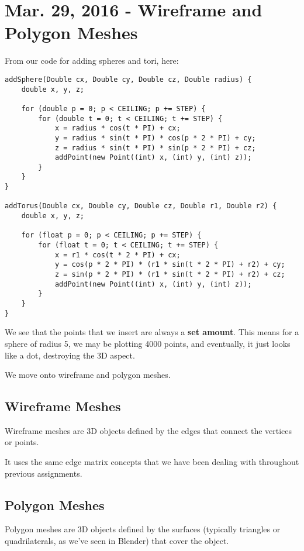 \documentclass[11pt,fleqn]{article}
\theoremstyle{definition}
\begin{document}
\section{Mar. 29, 2016 - Wireframe and Polygon Meshes}

From our code for adding spheres and tori, here:

\begin{verbatim}
addSphere(Double cx, Double cy, Double cz, Double radius) {
    double x, y, z;

    for (double p = 0; p < CEILING; p += STEP) {
        for (double t = 0; t < CEILING; t += STEP) {
            x = radius * cos(t * PI) + cx;
            y = radius * sin(t * PI) * cos(p * 2 * PI) + cy;
            z = radius * sin(t * PI) * sin(p * 2 * PI) + cz;
            addPoint(new Point((int) x, (int) y, (int) z));
        }
    }
}

addTorus(Double cx, Double cy, Double cz, Double r1, Double r2) {
    double x, y, z;

    for (float p = 0; p < CEILING; p += STEP) {
        for (float t = 0; t < CEILING; t += STEP) {
            x = r1 * cos(t * 2 * PI) + cx;
            y = cos(p * 2 * PI) * (r1 * sin(t * 2 * PI) + r2) + cy;
            z = sin(p * 2 * PI) * (r1 * sin(t * 2 * PI) + r2) + cz;
            addPoint(new Point((int) x, (int) y, (int) z));
        }
    }
}
\end{verbatim}

We see that the points that we insert are always a \textbf{set amount}. This means
for a sphere of radius 5, we may be plotting 4000 points, and eventually, it just
looks like a dot, destroying the 3D aspect.

We move onto wireframe and polygon meshes.

\subsection{Wireframe Meshes}

Wireframe meshes are 3D objects defined by the edges that connect the vertices or
points.

It uses the same edge matrix concepts that we have been dealing with throughout
previous assignments.

\subsection{Polygon Meshes}

Polygon meshes are 3D objects defined by the surfaces (typically triangles or
quadrilaterals, as we've seen in Blender) that cover the object.
\end{document}
